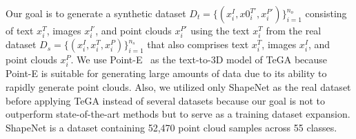 Our goal is to generate a synthetic dataset $D_{t} = \{(x_{i}^{I}, x0_{i}^{T \prime}, x_{i}^{P \prime})\}_{i=1}^{n_{o}} $ consisting of text $x_{i}^{T}$, images $x_{i}^{I \prime}$, and point clouds $x_{i}^{P \prime}$ using the text $x_{i}^{T}$ from the real dataset $D_{s} = \{(x_{i}^{I}, x_{i}^{T}, x_{i}^{P})\}_{i=1}^{n_{s}}$ that also comprises text $x_{i}^{T}$, images $x_{i}^{I}$, and point clouds $x_{i}^{P}$.
We use Point-E~\cite{nichol2022point} as the text-to-3D model of TeGA because Point-E is suitable for generating large amounts of data due to its ability to rapidly generate point clouds.
Also, we utilized only ShapeNet as the real dataset before applying TeGA instead of several datasets because our goal is not to outperform state-of-the-art methods but to serve as a training dataset expansion.
ShapeNet is a dataset containing 52,470 point cloud samples across 55 classes.



